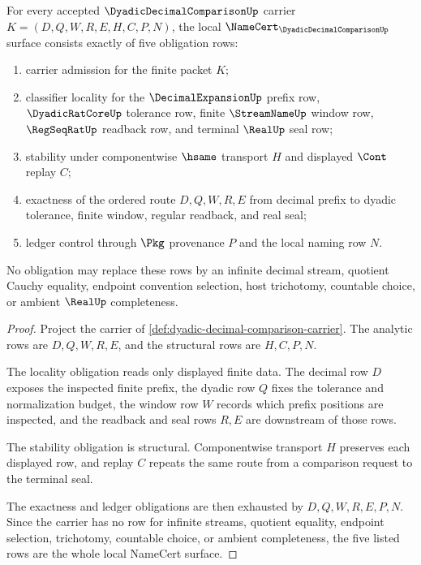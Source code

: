 \begin{theorem}
\label{thm:dyadic-decimal-comparison-namecert-obligations}
For every accepted $\DyadicDecimalComparisonUp$ carrier $K=(D,Q,W,R,E,H,C,P,N)$, the local $\NameCert_{\DyadicDecimalComparisonUp}$ surface consists exactly of five obligation rows:
\begin{enumerate}
\item carrier admission for the finite packet $K$;
\item classifier locality for the $\DecimalExpansionUp$ prefix row, $\DyadicRatCoreUp$ tolerance row, finite $\StreamNameUp$ window row, $\RegSeqRatUp$ readback row, and terminal $\RealUp$ seal row;
\item stability under componentwise $\hsame$ transport $H$ and displayed $\Cont$ replay $C$;
\item exactness of the ordered route $D,Q,W,R,E$ from decimal prefix to dyadic tolerance, finite window, regular readback, and real seal;
\item ledger control through $\Pkg$ provenance $P$ and the local naming row $N$.
\end{enumerate}
No obligation may replace these rows by an infinite decimal stream, quotient Cauchy equality, endpoint convention selection, host trichotomy, countable choice, or ambient $\RealUp$ completeness.
\end{theorem}
\begin{proof}
Project the carrier of \autoref{def:dyadic-decimal-comparison-carrier}. The analytic rows are $D,Q,W,R,E$, and the structural rows are $H,C,P,N$.

The locality obligation reads only displayed finite data. The decimal row $D$ exposes the inspected finite prefix, the dyadic row $Q$ fixes the tolerance and normalization budget, the window row $W$ records which prefix positions are inspected, and the readback and seal rows $R,E$ are downstream of those rows.

The stability obligation is structural. Componentwise transport $H$ preserves each displayed row, and replay $C$ repeats the same route from a comparison request to the terminal seal.

The exactness and ledger obligations are then exhausted by $D,Q,W,R,E,P,N$. Since the carrier has no row for infinite streams, quotient equality, endpoint selection, trichotomy, countable choice, or ambient completeness, the five listed rows are the whole local NameCert surface.
\end{proof}

